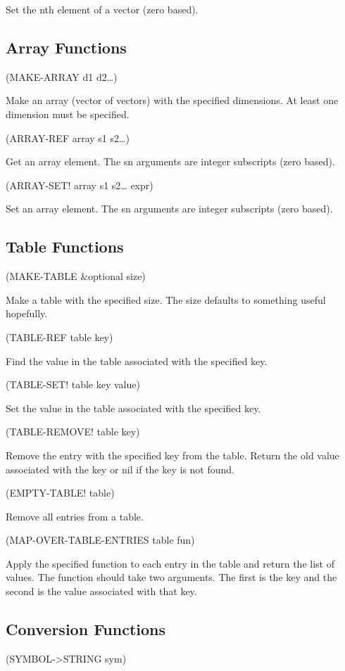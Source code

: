 \documentclass[11pt]{article}
\begin{document}
Set the nth element of a vector (zero based).
\subsection{Array Functions}
\label{sec-1-21}

(MAKE-ARRAY d1 d2\ldots{})

Make an array (vector of vectors) with the specified dimensions. At
least one dimension must be specified.

(ARRAY-REF array s1 s2\ldots{})

Get an array element. The sn arguments are integer subscripts (zero
based).

(ARRAY-SET! array s1 s2\ldots{} expr)

Set an array element. The sn arguments are integer subscripts (zero
based).
\subsection{Table Functions}
\label{sec-1-22}

(MAKE-TABLE \&optional size)

Make a table with the specified size.  The size defaults to something
useful hopefully.

(TABLE-REF table key)

Find the value in the table associated with the specified key.

(TABLE-SET! table key value)

Set the value in the table associated with the specified key.

(TABLE-REMOVE! table key)

Remove the entry with the specified key from the table.  Return the old
value associated with the key or nil if the key is not found.

(EMPTY-TABLE! table)

Remove all entries from a table.

(MAP-OVER-TABLE-ENTRIES table fun)

Apply the specified function to each entry in the table and return the
list of values.  The function should take two arguments.  The first is
the key and the second is the value associated with that key.
\subsection{Conversion Functions}
\label{sec-1-23}

(SYMBOL->STRING sym)
\end{document}
